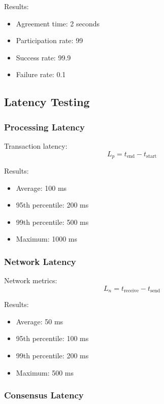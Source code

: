 \documentclass[12pt]{article}
\begin{document}
Results:
\begin{itemize}
\item Agreement time: 2 seconds
\item Participation rate: 99%
\item Success rate: 99.9%
\item Failure rate: 0.1%
\end{itemize}

\subsection{Latency Testing}

\subsubsection{Processing Latency}

Transaction latency:
\begin{equation}
L_p = t_{\text{end}} - t_{\text{start}}
\end{equation}

Results:
\begin{itemize}
\item Average: 100 ms
\item 95th percentile: 200 ms
\item 99th percentile: 500 ms
\item Maximum: 1000 ms
\end{itemize}

\subsubsection{Network Latency}

Network metrics:
\begin{equation}
L_n = t_{\text{receive}} - t_{\text{send}}
\end{equation}

Results:
\begin{itemize}
\item Average: 50 ms
\item 95th percentile: 100 ms
\item 99th percentile: 200 ms
\item Maximum: 500 ms
\end{itemize}

\subsubsection{Consensus Latency}
\end{document}
